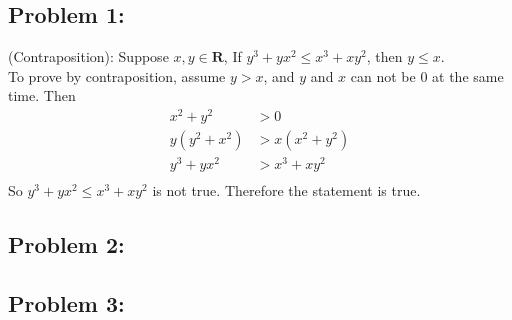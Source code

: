 \documentclass{article}
\begin{document}
 

\hypertarget{}{}
\subsection*{{Problem 1: }}
(Contraposition):  Suppose $x, y \in \mathbf{R}$, If $ y^3+yx^2\leq x^3+xy^2$, then $y\leq x$.  \\
To prove by contraposition, assume $y > x $, and $y$ and $x$ can not be $0$ at the same time. 
Then\begin{align*}
x^2+y^2 &> 0  \\
y(y^2+x^2) &> x(x^2+y^2) \\
 y^3+yx^2 &> x^3+xy^2 \\
\end{align*}
So $y^3+yx^2\leq x^3+xy^2$ is not true. Therefore the statement is true. 


\subsection*{{Problem 2: }}




\subsection*{{Problem 3: }}


\hypertarget{}{}
\end{document}
